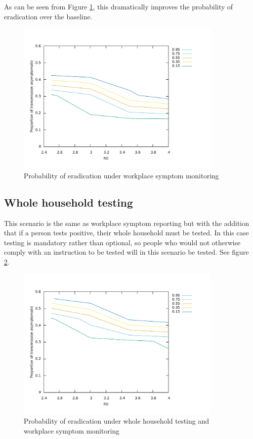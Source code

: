 \documentclass{article}
\begin{document}
As can be seen from Figure \ref{workplaceSymptom}, this dramatically improves the probability of eradication over the baseline.

\begin{figure}
\begin{center}
\includegraphics[width = 10cm]{workplaceSymptomMonitoring.pdf}
\end{center}
\caption{Probability of eradication under workplace symptom monitoring}
\label{workplaceSymptom}
\end{figure}

\subsection{Whole household testing}

This scenario is the same as workplace symptom reporting but with the addition that if a person tests positive, their whole household must be tested. In this case testing is mandatory rather than optional, so people who would not otherwise comply with an instruction to be tested will in this scenario be tested. See figure \ref{householdAndWorkplaceSymptom}.

\begin{figure}
\begin{center}
\includegraphics[width = 10cm]{householdEnforcement.pdf}
\end{center}
\caption{Probability of eradication under whole household testing and workplace symptom monitoring}
\label{householdAndWorkplaceSymptom}
\end{figure}
\end{document}
